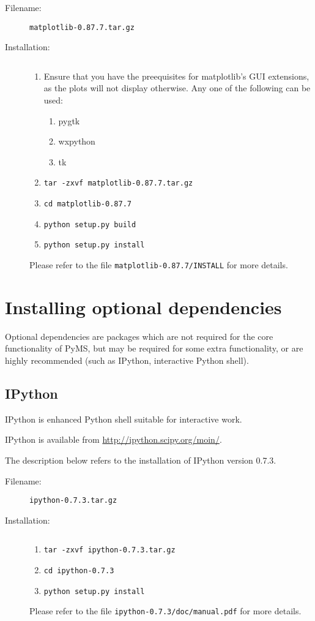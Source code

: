 \begin{description}
\item [Filename:] {\tt matplotlib-0.87.7.tar.gz}
\item [Installation:] $ $
  \begin{enumerate}
  \item Ensure that you have the preequisites for matplotlib's GUI
        extensions, as the plots will not display otherwise. Any one of
        the following can be used:
        \begin{enumerate}
        \item pygtk
        \item wxpython
        \item tk
        \end{enumerate}
  \item {\tt tar -zxvf matplotlib-0.87.7.tar.gz}
  \item {\tt cd matplotlib-0.87.7}
  \item {\tt python setup.py build}
  \item {\tt python setup.py install}
  \end{enumerate}
Please refer to the file {\tt matplotlib-0.87.7/INSTALL} for more
details.
\end{description}

\section{Installing optional dependencies}

Optional dependencies are packages which are not required for the
core functionality of PyMS, but may be required for some extra
functionality, or are highly recommended (such as IPython, interactive
Python shell). 

\subsection{IPython}

IPython is enhanced Python shell suitable for interactive work.

IPython is available from \url{http://ipython.scipy.org/moin/}.

The description below refers to the installation of IPython version
0.7.3.

\begin{description}
\item [Filename:] {\tt ipython-0.7.3.tar.gz}
\item [Installation:] $ $
  \begin{enumerate}
  \item {\tt tar -zxvf ipython-0.7.3.tar.gz}
  \item {\tt cd ipython-0.7.3}
  \item {\tt python setup.py install}
  \end{enumerate}
Please refer to the file {\tt ipython-0.7.3/doc/manual.pdf} for more
details.
\end{description}


